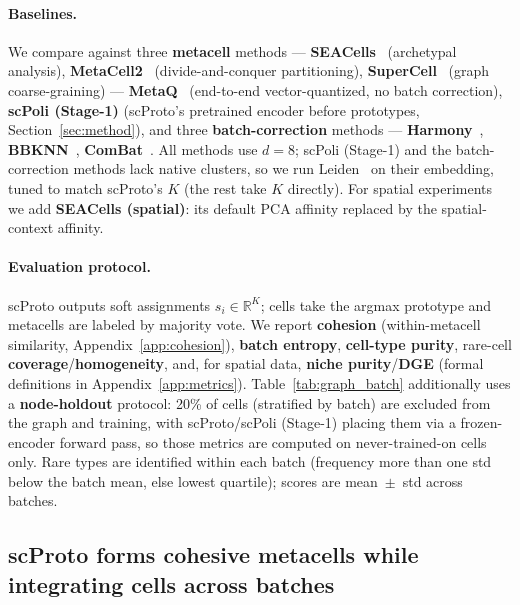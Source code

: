 \paragraph{Baselines.}
We compare against three \textbf{metacell} methods --- \textbf{SEACells}~\citep{seacells} (archetypal analysis), \textbf{MetaCell2}~\citep{metacell2} (divide-and-conquer partitioning), \textbf{SuperCell}~\citep{supercell} (graph coarse-graining) --- \textbf{MetaQ}~\citep{metaq} (end-to-end vector-quantized, no batch correction), \textbf{scPoli (Stage-1)} (scProto's pretrained encoder before prototypes, Section~\ref{sec:method}), and three \textbf{batch-correction} methods --- \textbf{Harmony}~\citep{harmony}, \textbf{BBKNN}~\citep{bbknn}, \textbf{ComBat}~\citep{combat}.
All methods use $d=8$; scPoli (Stage-1) and the batch-correction methods lack native clusters, so we run Leiden~\citep{traag2019leiden} on their embedding, tuned to match scProto's $K$ (the rest take $K$ directly). For spatial experiments we add \textbf{SEACells (spatial)}: its default PCA affinity replaced by the spatial-context affinity.

\paragraph{Evaluation protocol.}
scProto outputs soft assignments $s_i \in \mathbb{R}^K$; cells take the argmax prototype and metacells are labeled by majority vote. We report \textbf{cohesion} (within-metacell similarity, Appendix~\ref{app:cohesion}), \textbf{batch entropy}, \textbf{cell-type purity}, rare-cell \textbf{coverage}/\textbf{homogeneity}, and, for spatial data, \textbf{niche purity}/\textbf{DGE} (formal definitions in Appendix~\ref{app:metrics}).
Table~\ref{tab:graph_batch} additionally uses a \textbf{node-holdout} protocol: 20\% of cells (stratified by batch) are excluded from the graph and training, with scProto/scPoli (Stage-1) placing them via a frozen-encoder forward pass, so those metrics are computed on never-trained-on cells only.
Rare types are identified within each batch (frequency more than one std below the batch mean, else lowest quartile); scores are mean~$\pm$~std across batches.

\subsection{scProto forms cohesive metacells while integrating cells across batches}


